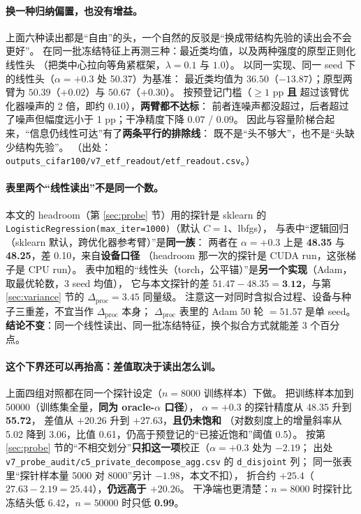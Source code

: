 \documentclass[11pt,a4paper]{ctexart}
\begin{document}
\paragraph{换一种归纳偏置，也没有增益。}
上面六种读出都是“自由”的头，一个自然的反驳是“换成带结构先验的读出会不会更好”。
在同一批冻结特征上再测三种：最近类均值，以及两种强度的原型正则化线性头
（把类中心拉向等角紧框架，$\lambda=0.1$ 与 $1.0$）。
以同一实现、同一 seed 下的线性头（$\alpha=+0.3$ 处 50.37）为基准：
最近类均值为 $36.50$（$-13.87$）；原型两臂为 $50.39$（$+0.02$）与 $50.67$（$+0.30$）。
按预登记门槛（$\ge1$ pp \textbf{且} 超过该臂优化器噪声的 2 倍，即约 $0.10$），\textbf{两臂都不达标}：
前者连噪声都没超过，后者超过了噪声但幅度远小于 1 pp；干净精度下降 $0.07$ / $0.09$。
因此与容量阶梯合起来，“信息仍线性可达”有了\textbf{两条平行的排除线}：
既不是“头不够大”，也不是“头缺少结构先验”。
（出处：\texttt{outputs\_cifar100/v7\_etf\_readout/etf\_readout.csv}。）

\paragraph{表里两个“线性读出”不是同一个数。}
本文的 headroom（第 \ref{sec:probe} 节）用的探针是 sklearn 的
\texttt{LogisticRegression(max\_iter=1000)}（默认 $C=1$、lbfgs），
与表中“逻辑回归（sklearn 默认，跨优化器参考臂）”是\textbf{同一族}：
两者在 $\alpha=+0.3$ 上是 \textbf{48.35} 与 \textbf{48.25}，差 0.10，来自\textbf{设备口径}
（headroom 那一次的探针是 CUDA run，这张梯子是 CPU run）。
表中加粗的“线性头（torch，公平锚）”是\textbf{另一个实现}（Adam，取最优轮数，3 seed 均值），
它与本文探针的差 $51.47-48.35=\textbf{3.12}$，与第 \ref{sec:variance} 节的
$\Delta_{\text{proc}}=3.45$ 同量级。
注意这一对同时含拟合过程、设备与种子三重差，不宜当作 $\Delta_{\text{proc}}$ 本身；
$\Delta_{\text{proc}}$ 表里的 Adam 50 轮 $=51.57$ 是单 seed。
\textbf{结论不变}：同一个线性读出、同一批冻结特征，换个拟合方式就能差 3 个百分点。

\paragraph{这个下界还可以再抬高：差值取决于读出怎么训。}
上面四组对照都在同一个探针设定（$n=8000$ 训练样本）下做。
把训练样本加到 50000（训练集全量，\textbf{同为 oracle-$\alpha$ 口径}），
$\alpha=+0.3$ 的探针精度从 48.35 升到 \textbf{55.72}，
差值从 $+20.26$ 升到 \textbf{$+27.63$}，\textbf{且仍未饱和}
（对数刻度上的增量斜率从 5.02 降到 3.06，比值 0.61，仍高于预登记的“已接近饱和”阈值 0.5）。
按第 \ref{sec:probe} 节的“不相交划分”\textbf{只扣这一项}校正（$\alpha=+0.3$ 处为 $-2.19$；
出处 \texttt{v7\_probe\_audit/c5\_private\_decompose\_agg.csv} 的 \texttt{d\_disjoint} 列；
同一张表里“探针样本量 5000 对 8000”另计 $-1.98$，本文不扣），
折合约 \textbf{$+25.4$}（$27.63-2.19=25.44$），\textbf{仍远高于 $+20.26$}。
干净端也更清楚：$n=8000$ 时探针比冻结头低 6.42，$n=50000$ 时只低 \textbf{0.99}。
\end{document}
